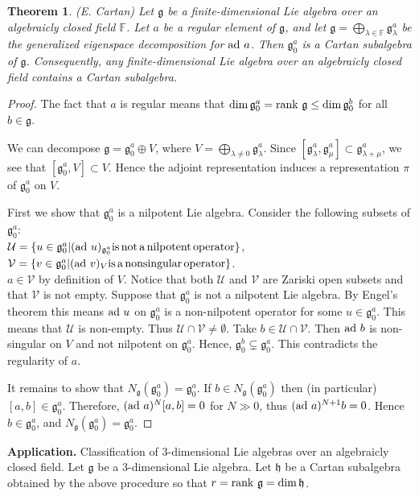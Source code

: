 \documentclass[12pt, fullpage]{article}
\newtheorem{theorem}{Theorem}
\newcommand{\g}{\mathfrak{g}}
\newcommand{\h}{\mathfrak{h}}
\newcommand{\ad}{{\rm ad\ }}
\newcommand{\rank}{{\rm rank\ }}
\newcommand{\F}{\mathbb{F}}
\newcommand{\U}{\mathcal{U}}
\newcommand{\V}{\mathcal{V}}
\newcommand{\go}{\g_0}
\newcommand{\goa}{{\g_0^a}}
\begin{document}
\begin{theorem}
\emph{(E. Cartan)}
Let $\g$ be a finite-dimensional Lie algebra over an algebraicly
closed  field $\F$.  Let $a$ be a regular element of $\g$, and let
$\g=\bigoplus_{\lambda\in\F} \g_\lambda^a$ be the generalized
eigenspace decomposition for $\ad a$.  Then $\go^a$ is a Cartan
subalgebra of $\g$.  Consequently, any finite-dimensional Lie algebra
over an algebraicly closed field contains a Cartan subalgebra.
\end{theorem}
\begin{proof}
The fact that $a$ is regular means that $\dim \go^a=\rank \g\leq\dim
\go^b$ for all $b\in\g$.

We can decompose $\g=\goa\oplus V$, where $V=\bigoplus_{\lambda\neq
0} \g_\lambda^a$.  Since $[\g_\lambda^a,\g_\mu^a]\subset
\g_{\lambda+\mu}^a$, we see that $[\go^a,V]\subset V$.  Hence the
adjoint representation induces a representation $\pi$ of $\goa$ on
$V$.

First we show that $\goa$ is a nilpotent Lie algebra.  Consider the
following subsets of $\goa$:\\
$\U=\{u\in\goa|(\ad u)_\goa {\rm
  is\,not\,a\,nilpotent\,operator}\}$,\\
$\V=\{v\in\goa|(\ad v)_V {\rm is\,a\,nonsingular\,operator}\}$.\\
$a\in\V$ by definition of $V$.  Notice that both $\U$ and $\V$ are
Zariski open subsets and that $\V$ is not empty.  Suppose that $\goa$
is not a nilpotent Lie algebra.  By Engel's theorem this means $\ad u$
on $\goa$ is a non-nilpotent operator for some $u\in\goa$.  This means
that $\U$ is non-empty.  Thus $\U\cap\V\neq\emptyset$.  Take
$b\in\U\cap\V$.  Then $\ad b$ is non-singular on $V$ and not nilpotent
on $\goa$.  Hence, $\go^b\subsetneq\goa$.  This contradicts the
regularity of $a$.

It remains to show that $N_\g(\goa)=\goa$.  If $b\in N_\g(\goa)$ then
(in particular) $[a,b]\in\goa$.  Therefore, $(\ad a)^N[a,b]=0$ for
$N\gg0$, thus $(\ad a)^{N+1}b=0$.  Hence $b\in\goa$, and
$N_\g(\goa)=\goa$.
\end{proof}

{\bf Application.}  Classification of $3$-dimensional Lie algebras
over an algebraicly closed field.  Let $\g$ be a $3$-dimensional Lie
algebra.  Let $\h$ be a Cartan subalgebra obtained by the above
procedure so that $r=\rank\g=\dim\h$.
\end{document}
